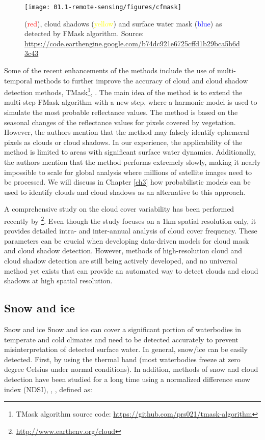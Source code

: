 \begin{figure}[H]
	\texttt{[image: 01.1-remote-sensing/figures/cfmask]}
	\caption{(\textcolor{red}{red}), cloud shadows (\textcolor{yellow}{yellow}) and surface water mask (\textcolor{blue}{blue}) as detected by FMask algorithm. Source: \url{https://code.earthengine.google.com/b74dc921e6725cffd1b29bca5b6d3c43}}
	\label{fig:cfmask}
\end{figure}

Some of the recent enhancements of the methods include the use of multi-temporal methods to further improve the accuracy of cloud and cloud shadow detection methods, TMask\footnote{TMask algorithm source code: \url{https://github.com/prs021/tmask-algorithm}}, \citep{zhu2014automated}. The main idea of the method is to extend the multi-step FMask algorithm with a new step, where a harmonic model is used to simulate the most probable reflectance values. The method is based on the seasonal changes of the reflectance values for pixels covered by vegetation. However, the authors mention that the method may falsely identify ephemeral pixels as clouds or cloud shadows. In our experience, the applicability of the method is limited to areas with significant surface water dynamics. Additionally, the authors mention that the method performs extremely slowly, making it nearly impossible to scale for global analysis where millions of satellite images need to be processed. We will discuss in Chapter \ref{ch3} how probabilistic models can be used to identify clouds and cloud shadows as an alternative to this approach. 

A comprehensive study on the cloud cover variability has been performed recently by \citep{wilson2016remotely}\footnote{\url{http://www.earthenv.org/cloud}}. Even though the study focuses on a 1km spatial resolution only, it provides detailed intra- and inter-annual analysis of cloud cover frequency. These parameters can be crucial when developing data-driven models for cloud mask and cloud shadow detection. However, methods of high-resolution cloud and cloud shadow detection are still being actively developed, and no universal method yet exists that can provide an automated way to detect clouds and cloud shadows at high spatial resolution. 

\subsection{Snow and ice}

Snow and ice Snow and ice can cover a significant portion of waterbodies in temperate and cold climates and need to be detected accurately to prevent misinterpretation of detected surface water. In general, snow/ice can be easily detected. First, by using the thermal band (most waterbodies freeze at zero degree Celsius under normal conditions). In addition, methods of snow and cloud detection have been studied for a long time using a normalized difference snow index (NDSI), \citep{valovcin1976snow}, \citep{hall1995development}, defined as:

